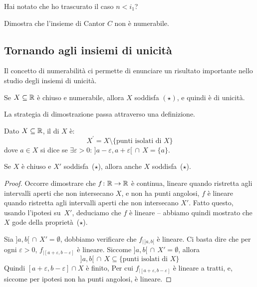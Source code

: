 \begin{exercise}
Hai notato che ho trascurato il caso $n < i_1$?
\end{exercise}

\begin{exercise}
Dimostra che l'insieme di Cantor $C$ non \`e numerabile.
\end{exercise}

\subsection{Tornando agli insiemi di unicit\`a}

Il concetto di numerabilit\`a ci permette di enunciare un risultato importante
nello studio degli insiemi di unicit\`a.

\begin{theorem}
\label{CL}
Se $X \subseteq \mathbb R$ \`e chiuso e numerabile, allora $X$ soddisfa $(\star)$, e quindi \`e di unicit\`a.
\end{theorem}

La strategia di dimostrazione passa attraverso una definizione.

\begin{definition}
Dato $X \subseteq \mathbb R$, il  di $X$ \`e:
\[ X^{\prime} = X \setminus\{\text{punti isolati di $X$}\}
	\]
dove $a \in X$ si dice  se $\exists \varepsilon > 0 :\, ]a - \varepsilon, a + \varepsilon[ \,\cap\, X = \{a\}$.
\end{definition}

\begin{remark}
Se $X$ \`e chiuso e $X'$ soddisfa~($\star$), allora anche $X$
soddisfa~($\star$).
\end{remark}

\begin{proof}
Occorre dimostrare che  $f\colon \mathbb R \to \mathbb R$ \`e continua, lineare
quando ristretta agli intervalli aperti che non intersecano $X$, e non ha
punti angolosi,  $f$ \`e lineare quando ristretta agli intervalli
aperti che non intersecano $X'$.
Fatto questo, usando l'ipotesi su~$X'$, deduciamo che $f$ \`e lineare -- abbiamo
quindi mostrato che $X$ gode della propriet\`a~($\star$).

Sia $]a,b[ \,\cap\, X' = \emptyset$, dobbiamo verificare che $f_{|\,]a,b[}$ \`e
lineare. Ci basta dire che per ogni $\varepsilon > 0$, $f_{|[a+\varepsilon,
b-\varepsilon]}$ \`e lineare.
Siccome $]a,b[ \, \cap \, X' = \emptyset$, allora
\[ ]a,b[ \,\cap\, X \subseteq
\{\text{punti isolati di $X$}\} \]
Quindi $[a+\varepsilon, b-\varepsilon] \cap
X$ \`e finito,  Per cui $f_{|[a+\varepsilon, b-\varepsilon]}$ \`e lineare
a tratti, e, siccome per ipotesi non ha punti angolosi, \`e lineare.
\end{proof}

